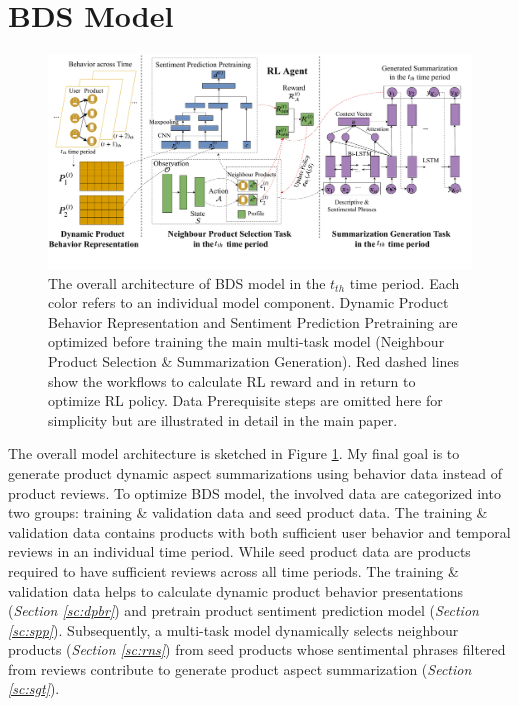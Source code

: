 \section{BDS Model} \label{bds}

\begin{figure} 
	\centering
	\includegraphics[width=1\textwidth]{img/chapter5/pipeline.pdf}
	\caption{ The overall architecture of BDS model in the $t_{th} $ time period. Each color refers to an individual model component. Dynamic Product Behavior Representation and Sentiment Prediction Pretraining are optimized before training the main multi-task model (Neighbour Product Selection \& Summarization Generation). Red dashed lines show the workflows to calculate RL reward and in return to optimize RL policy. Data Prerequisite steps are omitted here for simplicity but are illustrated in detail in the main paper. }
	\label{fig:c5_pipeline}
\end{figure}

The overall model architecture is sketched in Figure \ref{fig:c5_pipeline}. My final goal is to generate product dynamic aspect summarizations using behavior data instead of product reviews. To optimize BDS model, the involved data are categorized into two groups: training \& validation data and seed product data. The training \& validation data contains products with both sufficient user behavior and temporal reviews in an individual time period. While seed product data are products required to have sufficient reviews across all time periods. The training \& validation data helps to calculate dynamic product behavior presentations (\textit{Section \ref{sc:dpbr}}) and pretrain product sentiment prediction model (\textit{Section \ref{sc:spp}}). Subsequently, a multi-task model dynamically selects neighbour products (\textit{Section \ref{sc:rns}}) from seed products whose sentimental phrases filtered from reviews  contribute to generate product aspect summarization (\textit{Section \ref{sc:sgt}}). 

